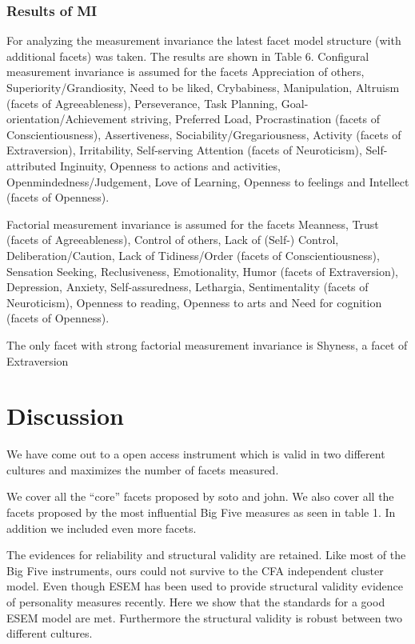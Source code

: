 \documentclass[,man,floatsintext]{apa6}
\theoremstyle{definition}
\theoremstyle{definition}
\theoremstyle{definition}
\theoremstyle{remark}
\begin{document}
\hypertarget{results-of-mi}{%
\subsubsection{Results of MI}\label{results-of-mi}}

For analyzing the measurement invariance the latest facet model
structure (with additional facets) was taken. The results are shown in
Table 6. Configural measurement invariance is assumed for the facets
Appreciation of others, Superiority/Grandiosity, Need to be liked,
Crybabiness, Manipulation, Altruism (facets of Agreeableness),
Perseverance, Task Planning, Goal-orientation/Achievement striving,
Preferred Load, Procrastination (facets of Conscientiousness),
Assertiveness, Sociability/Gregariousness, Activity (facets of
Extraversion), Irritability, Self-serving Attention (facets of
Neuroticism), Self-attributed Inginuity, Openness to actions and
activities, Openmindedness/Judgement, Love of Learning, Openness to
feelings and Intellect (facets of Openness).

Factorial measurement invariance is assumed for the facets Meanness,
Trust (facets of Agreeableness), Control of others, Lack of (Self-)
Control, Deliberation/Caution, Lack of Tidiness/Order (facets of
Conscientiousness), Sensation Seeking, Reclusiveness, Emotionality,
Humor (facets of Extraversion), Depression, Anxiety, Self-assuredness,
Lethargia, Sentimentality (facets of Neuroticism), Openness to reading,
Openness to arts and Need for cognition (facets of Openness).

The only facet with strong factorial measurement invariance is Shyness,
a facet of Extraversion

\hypertarget{discussion}{%
\section{Discussion}\label{discussion}}

We have come out to a open access instrument which is valid in two
different cultures and maximizes the number of facets measured.

We cover all the \enquote{core} facets proposed by soto and john. We
also cover all the facets proposed by the most influential Big Five
measures as seen in table 1. In addition we included even more facets.

The evidences for reliability and structural validity are retained. Like
most of the Big Five instruments, ours could not survive to the CFA
independent cluster model. Even though ESEM has been used to provide
structural validity evidence of personality measures recently. Here we
show that the standards for a good ESEM model are met. Furthermore the
structural validity is robust between two different cultures.
\end{document}
